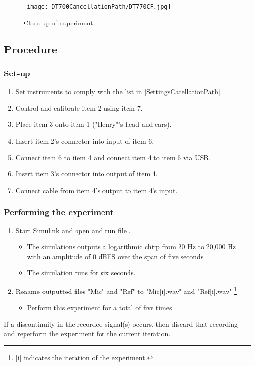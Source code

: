 \begin{figure}[H]
	\centering
	\texttt{[image: DT700CancellationPath/DT770CP.jpg]}
	\caption{Close up of experiment.}
	\label{CloseUpCancellationPath}
\end{figure}
\newpage
\subsection{Procedure}
\subsubsection{Set-up}
\begin{enumerate}
	\item Set instruments to comply with the list in \ref{SettingsCacellationPath}.
	\item Control and calibrate item 2 using item 7.
	\item Place item 3 onto item 1 ("Henry"'s head and ears).
	\item Insert item 2's connector into input of item 6.
	\item Connect item 6 to item 4 and connect item 4 to item 5 via USB.
	\item Insert item 3's connector into output of item 4.
	\item Connect cable from item 4's output to item 4's input.
\end{enumerate}

\subsubsection{Performing the experiment}
\begin{enumerate}
	\item Start Simulink\textsuperscript{\textregistered} and open and run file .
	\begin{itemize} 
		\item The simulations outputs a logarithmic chirp from 20 Hz to 20,000 Hz with an amplitude of 0 dBFS over the span of five seconds.
		\item The simulation runs for six seconds.
	\end{itemize}
	\item Rename outputted files "Mic" and "Ref" to "Mic[i].wav" and "Ref[i].wav" \footnote{[i] indicates the iteration of the experiment.}
	\begin{itemize}
		\item[] Perform this experiment for a total of five times.
	\end{itemize}
\end{enumerate}
If  a discontinuity in the recorded signal(s) occurs, then discard that recording and reperform the experiment for the current iteration.


